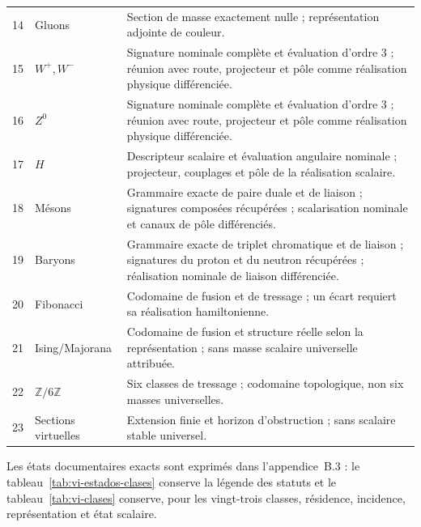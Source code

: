 \begin{table}[!htbp]
\begin{tabular}{@{}p{.11\linewidth}p{.20\linewidth}p{.62\linewidth}@{}}
\\
 14&Gluons
&Section de masse exactement nulle ; représentation adjointe de couleur.
\\
 15&\(W^+,W^-\)&Signature nominale complète et évaluation d’ordre \(3\) ; réunion avec route, projecteur et pôle comme réalisation physique différenciée.
\\
 16&\(Z^0\)&Signature nominale complète et évaluation d’ordre \(3\) ; réunion avec route, projecteur et pôle comme réalisation physique différenciée.
\\
 17&\(H\)&Descripteur scalaire et évaluation angulaire nominale ; projecteur, couplages et pôle de la réalisation scalaire.
\\
 18&Mésons
&Grammaire exacte de paire duale et de liaison ; signatures composées récupérées ; scalarisation nominale et canaux de pôle différenciés.
\\
 19&Baryons
&Grammaire exacte de triplet chromatique et de liaison ; signatures du proton et du neutron récupérées ; réalisation nominale de liaison différenciée.
\\
 20&Fibonacci
&Codomaine de fusion et de tressage ; un écart requiert sa réalisation hamiltonienne.
\\
 21&Ising/Majorana&Codomaine de fusion et structure réelle selon la représentation ; sans masse scalaire universelle attribuée.
\\
 22&\(\mathbb Z/6\mathbb Z\)&Six classes de tressage ; codomaine topologique, non six masses universelles.
\\
 23&Sections virtuelles&Extension finie et horizon d’obstruction ; sans scalaire stable universel.
\\
\end{tabular}
\end{table}

Les états documentaires exacts sont exprimés dans l’appendice~B.3 : le
tableau~\ref{tab:vi-estados-clases} conserve la légende des statuts et le
tableau~\ref{tab:vi-clases} conserve, pour les vingt-trois classes, résidence,
incidence, représentation et état scalaire.


